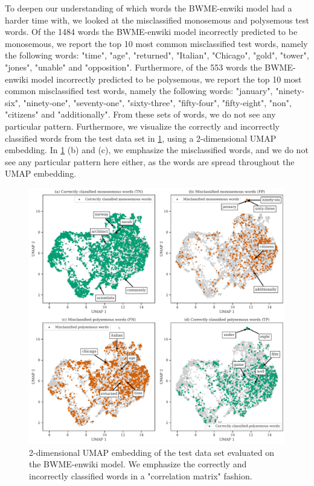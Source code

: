 To deepen our understanding of which words the BWME-enwiki model had a harder time with, we looked at the misclassified monosemous and polysemous test words. Of the 1484 words the BWME-enwiki model incorrectly predicted to be monosemous, we report the top 10 most common misclassified test words, namely the following words: "time", "age", "returned", "Italian", "Chicago", "gold", "tower", "jones", "unable" and "opposition". Furthermore, of the 553 words the BWME-enwiki model incorrectly predicted to be polysemous, we report the top 10 most common misclassified test words, namely the following words: "january", "ninety-six", "ninety-one", "seventy-one", "sixty-three", "fifty-four", "fifty-eight", "non", "citizens" and "additionally". From these sets of words, we do not see any particular pattern. Furthermore, we visualize the correctly and incorrectly classified words from the test data set in \cref{fig:bwme-enwiki-umap-classified-words}, using a 2-dimensional UMAP embedding. In \cref{fig:bwme-enwiki-umap-classified-words} (b) and (c), we emphasize the misclassified words, and we do not see any particular pattern here either, as the words are spread throughout the UMAP embedding.
\begin{figure}[H]
    \centering
    \includegraphics[width=\textwidth]{thesis/figures/bwme-enwiki-umap-classified-words.pdf}
    \caption{2-dimensional UMAP embedding of the test data set evaluated on the BWME-enwiki model. We emphasize the correctly and incorrectly classified words in a "correlation matrix" fashion.}
    \label{fig:bwme-enwiki-umap-classified-words}
\end{figure}

